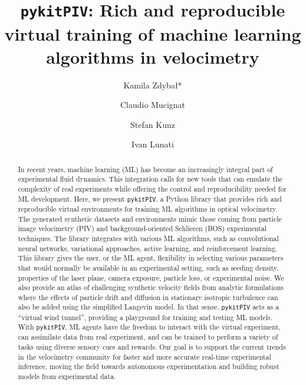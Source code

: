 \documentclass[a4paper,fleqn]{cas-dc}
\begin{document}

\title [mode = title]{\texttt{pykitPIV}: Rich and reproducible virtual training of machine learning algorithms in velocimetry}

\author[EMPA]{Kamila Zdyba\l{}*}

\author[EMPA]{Claudio Mucignat}
\author[EMPA]{Stefan Kunz}
\author[EMPA]{Ivan Lunati}

\address[EMPA]{Laboratory for Computational Engineering, Swiss Federal Laboratories for Materials Science and Technology, Empa, Dübendorf, Switzerland}

\begin{abstract}
In recent years, machine learning (ML) has become an increasingly integral part of experimental fluid dynamics. This integration calls for new tools that can emulate the complexity of real experiments while offering the control and reproducibility needed for ML development. Here, we present \texttt{pykitPIV}, a Python library that provides rich and reproducible virtual environments for training ML algorithms in optical velocimetry. The generated synthetic datasets and environments mimic those coming from particle image velocimetry (PIV) and background-oriented Schlieren (BOS) experimental techniques. 
The library integrates with various ML algorithms, such as convolutional neural networks, variational approaches, active learning, and reinforcement learning. This library gives the user, or the ML agent, flexibility in selecting various parameters that would normally be available in an experimental setting, such as seeding density, properties of the laser plane, camera exposure, particle loss, or experimental noise. We also provide an atlas of challenging synthetic velocity fields from analytic formulations where the effects of particle drift and diffusion in stationary isotropic turbulence can also be added using the simplified Langevin model. In that sense, \texttt{pykitPIV} acts as a ``virtual wind tunnel'', providing a playground for training and testing ML models. 
With \texttt{pykitPIV}, ML agents have the freedom to interact with the virtual experiment, can assimilate data from real experiment, and can be trained to perform a variety of tasks using diverse sensory cues and rewards. Our goal is to support the current trends in the velocimetry community for faster and more accurate real-time experimental inference, moving the field towards autonomous experimentation and building robust models from experimental data.
\end{abstract}
\end{document}

